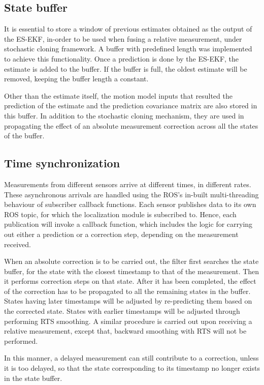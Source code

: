 \subsection{State buffer}
It is essential to store a window of previous estimates obtained as the output of the \gls{ES-EKF}, in-order to be used when fusing a relative measurement, under stochastic cloning framework. A buffer with predefined length was implemented to achieve this functionality. Once a prediction is done by the \gls{ES-EKF}, the estimate is added to the buffer. If the buffer is full, the oldest estimate will be removed, keeping the buffer length a constant.

Other than the estimate itself, the motion model inputs that resulted the prediction of the estimate and the prediction covariance matrix are also stored in this buffer. In addition to the stochastic cloning mechanism, they are used in propagating the effect of an absolute measurement correction across all the states of the buffer.

\subsection{Time synchronization}
Measurements from different sensors arrive at different times, in different rates. These asynchronous arrivals are handled using the \gls{ROS}'s in-built multi-threading behaviour of subscriber callback functions. Each sensor publishes data to its own \gls{ROS} topic, for which the localization module is subscribed to. Hence, each publication will invoke a callback function, which includes the logic for carrying out either a prediction or a correction step, depending on the measurement received.

When an absolute correction is to be carried out, the filter first searches the state buffer, for the state with the closest timestamp to that of the measurement. Then it performs correction steps on that state. After it has been completed, the effect of the correction has to be propagated to all the remaining states in the buffer. States having later timestamps will be adjusted by re-predicting them based on the corrected state. States with earlier timestamps will be adjusted through performing \gls{RTS} smoothing. A similar procedure is carried out upon receiving a relative measurement, except that, backward smoothing with \gls{RTS} will not be performed.

In this manner, a delayed measurement can still contribute to a correction, unless it is too delayed, so that the state corresponding to its timestamp no longer exists in the state buffer.

